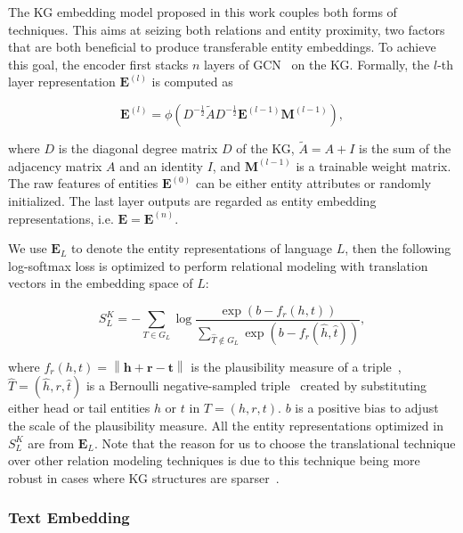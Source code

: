 \documentclass[11pt,a4paper]{article}
\begin{document}
The KG embedding model proposed in this work couples both forms of techniques. This aims at seizing both relations and entity proximity, two factors that are both beneficial to produce transferable entity embeddings.
To achieve this goal, the encoder first stacks $n$ layers of GCN~\cite{kipf2017gcn} on the KG.
Formally, the $l$-th layer representation $\mathbf{E}^{(l)}$ is computed as

\begin{equation*}
    \mathbf{E}^{(l)}=\phi\left ( D^{-\frac{1}{2}}\tilde{A}D^{-\frac{1}{2}} \mathbf{E}^{(l-1)} \mathbf{M}^{(l-1)} \right ),
\end{equation*}

\noindent
where $D$ is the diagonal degree matrix $D$ of the KG, $\tilde{A}=A+I$ is the sum of the adjacency matrix $A$ and an identity $I$,
and $\mathbf{M}^{(l-1)}$ is a trainable weight matrix.
The raw features of entities $\mathbf{E}^{(0)}$ can be either entity attributes or randomly initialized.
The last layer outputs are regarded as entity embedding representations, i.e. $\mathbf{E}=\mathbf{E}^{(n)}$.

We use $\mathbf{E}_L$ to denote the entity representations of language $L$,
then the following log-softmax loss is optimized to perform relational modeling with translation vectors in the embedding space of $L$:

\begin{equation*}
    S^K_L=-\sum_{T\in G_L}\log\frac{\exp\left (b -f_r(h,t) \right )}{\sum_{\hat{T}\notin G_L}\exp\left (b -f_r(\hat{h},\hat{t}) \right )},
\end{equation*}

\noindent
where $f_r(h,t)=\left \| \mathbf{h}+\mathbf{r}-\mathbf{t}\right \|$ is the plausibility measure of a triple~\cite{bordes2013translating},
$\hat{T}=(\hat{h},r,\hat{t})$ is a Bernoulli negative-sampled triple~\cite{wang2014knowledge} created by substituting either head or tail entities $h$ or $t$ in $T=(h,r,t)$.
$b$ is a positive bias to adjust the scale of the plausibility measure. 
All the entity representations optimized in $S^K_L$ are from $\mathbf{E}_L$.
Note that the reason for us to choose the translational technique over other relation modeling techniques is due to this technique being more robust in cases where KG structures are sparser~\cite{pujara2017sparsity}.

\subsubsection{Text Embedding}
\end{document}
